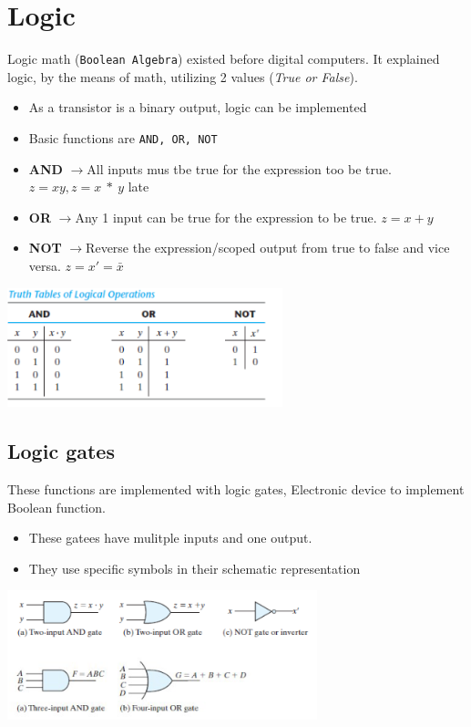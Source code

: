 \documentclass[a4paper,12pt]{article}
\newcommand{\ra}{$\rightarrow$}
\begin{document}
        \section{Logic}
        Logic math (\texttt{Boolean Algebra}) existed before digital computers. It explained logic, by the means of math, utilizing 2 values (\textit{True or False}).
        \begin{itemize}
            \item As a transistor is a binary output, logic can be implemented
            \item Basic functions are \texttt{AND, OR, NOT}
        \end{itemize}
        \hrulefill
        \begin{itemize}
            \item \textbf{AND} \ra All inputs mus tbe true for the expression too be true. $z=xy,z=x~*~y$
           late \item \textbf{OR} \ra Any 1 input can be true for the expression to be true. $z=x+y$
            \item \textbf{NOT} \ra Reverse the expression/scoped output from true to false and vice versa. $z=x'=\bar{x}$
        \end{itemize}
        \begin{center}\includegraphics[width=8cm]{Truth Tables.png}\end{center}

    \subsection{Logic gates}
        These functions are implemented with logic gates, Electronic device to implement Boolean function.
        \begin{itemize}
            \item These gatees have mulitple inputs and one output.
            \item They use specific symbols in their schematic representation
        \end{itemize}
        \begin{center}\includegraphics[width=9cm]{Logic Gates.png}\end{center}
\end{document}
